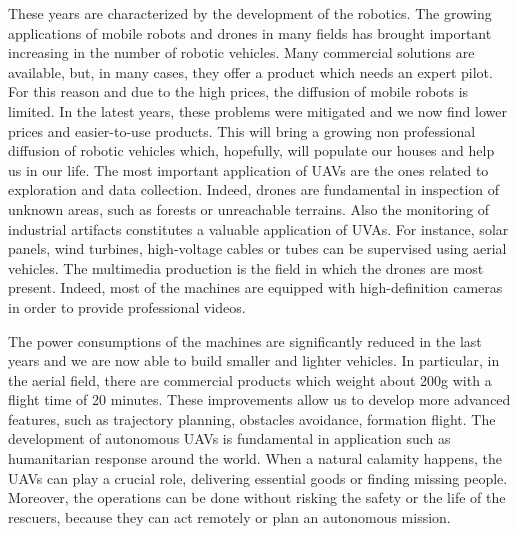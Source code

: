 


These years are characterized by the development of the robotics.
The growing applications of mobile robots and drones in many fields
has brought important increasing in the number of robotic vehicles.
Many commercial solutions are available, but, in many cases, they offer
a product which needs an expert pilot. For this reason and due to the high prices,
the diffusion of mobile robots is limited. In the latest years, these problems were
mitigated and we now find lower prices and easier-to-use products. This will bring a
growing non professional diffusion of robotic vehicles which, hopefully, will populate
our houses and help us in our life.
The most important application of UAVs are the ones related to exploration and data
collection. Indeed, drones are fundamental in inspection of unknown areas, such as
forests or unreachable terrains.
Also the monitoring of industrial artifacts constitutes a valuable application of UVAs.
For instance, solar panels, wind turbines, high-voltage cables or tubes can be
supervised using aerial vehicles.
The multimedia production is the field in which the drones are most present. Indeed,
most of the machines are equipped with high-definition cameras in order to provide
professional videos.

The power consumptions of the machines are significantly reduced in the last years
and we are now able to build smaller and lighter vehicles.
In particular, in the aerial field, there are commercial products which weight
about 200g with a flight time of 20 minutes.
These improvements allow us to develop more advanced features, such as
trajectory planning, obstacles avoidance, formation flight.
The development of autonomous UAVs is fundamental in application such as humanitarian
response around the world. When a natural calamity happens, the UAVs can play a
crucial role, delivering essential goods or finding missing people. Moreover, the
operations can be done without risking the safety or the life of the rescuers, because
they can act remotely or plan an autonomous mission.

